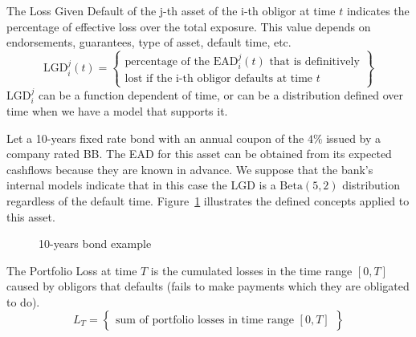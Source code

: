 \documentclass[11pt,fleqn]{book} %
\begin{document}
\begin{definition}
	The Loss Given Default of the j-th asset of the i-th obligor at time $t$ 
	indicates the percentage of effective loss over the total exposure. This
	value depends on endorsements, guarantees, type of asset, default time, etc.
	\begin{displaymath}
		\text{LGD}_i^j(t) = \left\{
		\begin{array}{c}
			\text{percentage of the $\text{EAD}_i^j(t)$ that is definitively} \\
			\text{lost if the i-th obligor defaults at time $t$}
		\end{array}
		\right\}
	\end{displaymath}
	$\text{LGD}_i^j$ can be a function dependent of time, or can be a 
	distribution defined over time when we have a model that supports it. 
\end{definition}

\begin{example}
	Let a 10-years fixed rate bond with an annual coupon of the
	$4\%$ issued by a company rated BB\@.
	The EAD for this asset can be obtained from its expected cashflows 
	because they are known in advance. We suppose that the bank's
	internal models indicate that in this case the LGD is a 
	$\text{Beta}(5,2)$ distribution regardless of the default time.
	Figure~\ref{figure:bond} illustrates the defined concepts applied 
	to this asset.
	\begin{figure}[!ht]
		\centering
		\caption{10-years bond example}
		\label{figure:bond} 
	\end{figure}
\end{example}

\begin{definition}
	The Portfolio Loss at time $T$ is the cumulated losses in the time 
	range $[0,T]$ caused by obligors that defaults (fails to make 
	payments which they are obligated to do).
	\begin{displaymath}
		L_T = \left\{
		\begin{array}{c}
			\text{sum of portfolio losses in time range $[0,T]$}
		\end{array}
		\right\}
	\end{displaymath}
\end{definition}
\end{document}
